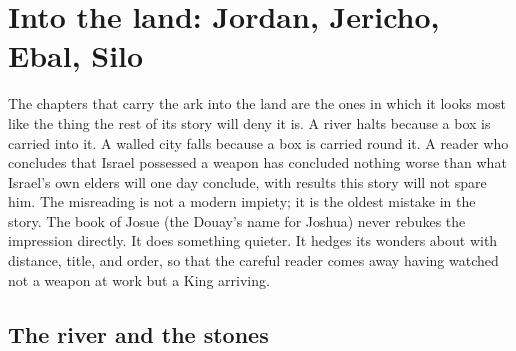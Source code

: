 \sectionguard
\section{Into the land: Jordan, Jericho, Ebal, Silo}

The chapters that carry the ark into the land are the ones in which it looks
most like the thing the rest of its story will deny it is. A river halts
because a box is carried into it. A walled city falls because a box is
carried round it. A reader who concludes that Israel possessed a weapon has
concluded nothing worse than what Israel's own elders will one day conclude,
with results this story will not spare him. The misreading is not a modern
impiety; it is the oldest mistake in the story. The book of Josue (the
Douay's name for Joshua) never rebukes the impression directly. It does
something quieter. It hedges its wonders about with distance, title, and
order, so that the careful reader comes away having watched not a weapon at
work but a King arriving.



\subsection{The river and the stones}

